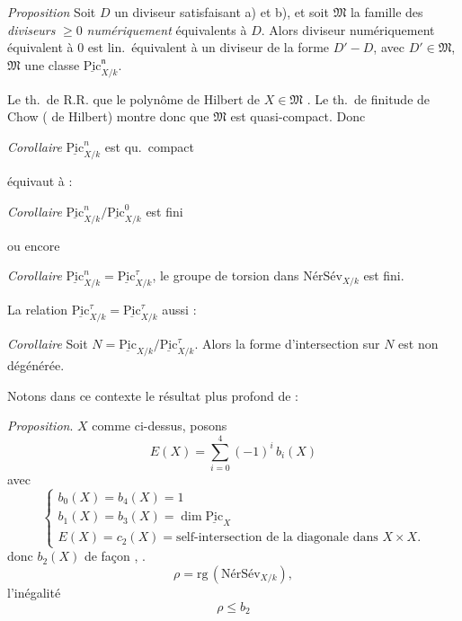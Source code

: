 \documentclass[11pt,a4paper]{article}
\begin{document}
\emph{Proposition} Soit $D$ un diviseur satisfaisant a) et b), et soit $\mathfrak{M}$ la famille des \emph{diviseurs} $\geqslant 0$ \emph{numériquement} équivalents à $D$. Alors \struck{\ill{}}  diviseur numériquement équivalent à $0$ est lin.\ équivalent à un diviseur de la forme $D' - D$, avec $D' \in \mathfrak{M}$,   $\mathfrak{M}$  une classe  $\underline{\mathrm{Pic}}^{\mathfrak{n}}_{X/k}$.

Le th.\ de  R.R.   que le polynôme de Hilbert de $X \in \mathfrak{M}$    . Le th.\ de finitude de Chow (   de Hilbert) montre donc que $\mathfrak{M}$ est quasi-compact.
Donc

\emph{Corollaire} $\underline{\mathrm{Pic}}^{n}_{X/k}$ est qu.\ compact \struck{\ill{}}

 équivaut à :

\emph{Corollaire} $\underline{\mathrm{Pic}}^{n}_{X/k} / \underline{\mathrm{Pic}}^{0}_{X/k}$ est fini

ou encore

\emph{Corollaire} $\underline{\mathrm{Pic}}^{n}_{X/k} = \underline{\mathrm{Pic}}^{\tau}_{X/k}$, le groupe de torsion \struck{\ill{}} dans $\mathrm{NérSév}_{X/k}$ est fini.

La relation $\underline{\mathrm{Pic}}^{\tau}_{X/k} = \underline{\mathrm{Pic}}^{\tau}_{X/k}$  aussi :

\emph{Corollaire} Soit $N = \underline{\mathrm{Pic}}_{X/k} / \underline{\mathrm{Pic}}^{\tau}_{X/k}$. Alors la forme d'intersection sur $N$ est non dégénérée.

Notons dans ce contexte le résultat plus profond de  :

\emph{Proposition}. $X$ comme ci-dessus, \struck{\ill{}} posons
\[
E(X) = \sum_{i=0}^{4} (-1)^i\, b_i(X)
\]
avec
\[
\begin{cases}
b_0(X) = b_4(X) = 1 \\
b_1(X) = b_3(X) = \dim \underline{\mathrm{Pic}}_X \\
E(X) = c_2(X) = \text{self-intersection de la diagonale dans } X\times X.
\end{cases}
\]
   donc $b_2(X)$ de façon ,  . 
\[
\rho = \mathrm{rg}\,(\mathrm{NérSév}_{X/k}),
\]
   l'inégalité
\[
\boxed{\rho \leqslant b_2}
\]
\end{document}
